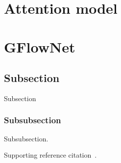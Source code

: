 \section{Attention model \cite{Bahdanau2014NeuralMT}}

\section{GFlowNet \cite{Bengio2021GFlowNetF}}

\subsection{Subsection}

Subsection

\subsubsection{Subsubsection}

Subsubsection.

Supporting reference citation~\cite{lecun2015}.
